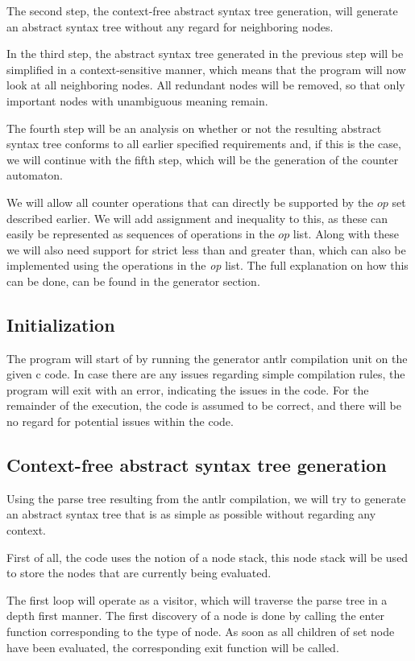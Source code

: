 \documentclass[12pt]{article}
\begin{document}
The second step, the context-free abstract syntax tree generation, will generate an abstract syntax tree without any regard for neighboring nodes.

In the third step, the abstract syntax tree generated in the previous step will be simplified in a context-sensitive manner, which means that the program will now look at all neighboring nodes. All redundant nodes will be removed, so that only important nodes with unambiguous meaning remain.

The fourth step will be an analysis on whether or not the resulting abstract syntax tree conforms to all earlier specified requirements and, if this is the case, we will continue with the fifth step, which will be the generation of the counter automaton.

We will allow all counter operations that can directly be supported by the $op$ set described earlier. We will add assignment and inequality to this, as these can easily be represented as sequences of operations in the $op$ list. Along with these we will also need support for strict less than and greater than, which can also be implemented using the operations in the \textit{op} list. The full explanation on how this can be done, can be found in the generator section.

\subsection{Initialization}
The program will start of by running the generator antlr compilation unit on the given c code. In case there are any issues regarding simple compilation rules, the program will exit with an error, indicating the issues in the code. For the remainder of the execution, the code is assumed to be correct, and there will be no regard for potential issues within the code.

\subsection{Context-free abstract syntax tree generation}
Using the parse tree resulting from the antlr compilation, we will try to generate an abstract syntax tree that is as simple as possible without regarding any context. 

First of all, the code uses the notion of a node stack, this node stack will be used to store the nodes that are currently being evaluated.

The first loop will operate as a visitor, which will traverse the parse tree in a depth first manner. The first discovery of a node is done by calling the enter function corresponding to the type of node. As soon as all children of set node have been evaluated, the corresponding exit function will be called. 
\end{document}
